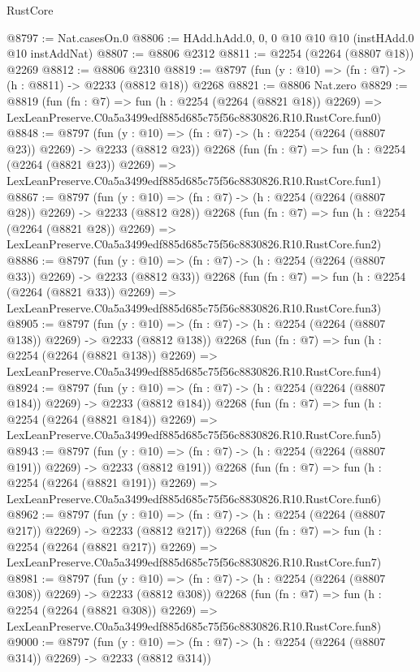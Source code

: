 \begin{lexlean}{RustCore}
\begin{coremodule}
@8797 := Nat.casesOn.{0}
@8806 := HAdd.hAdd.{0, 0, 0} @10 @10 @10 (instHAdd.{0} @10 instAddNat)
@8807 := @8806 @2312
@8811 := @2254 (@2264 (@8807 @18)) @2269
@8812 := @8806 @2310
@8819 := @8797 (fun (y : @10) => (fn : @7) -> (h : @8811) -> @2233 (@8812 @18)) @2268
@8821 := @8806 Nat.zero
@8829 := @8819
    (fun (fn : @7) =>
    fun (h : @2254 (@2264 (@8821 @18)) @2269) =>
    LexLeanPreserve.C0a5a3499edf885d685c75f56c8830826.R10.RustCore.fun0)
@8848 := @8797
    (fun (y : @10) => (fn : @7) -> (h : @2254 (@2264 (@8807 @23)) @2269) -> @2233 (@8812 @23))
    @2268
    (fun (fn : @7) =>
    fun (h : @2254 (@2264 (@8821 @23)) @2269) =>
    LexLeanPreserve.C0a5a3499edf885d685c75f56c8830826.R10.RustCore.fun1)
@8867 := @8797
    (fun (y : @10) => (fn : @7) -> (h : @2254 (@2264 (@8807 @28)) @2269) -> @2233 (@8812 @28))
    @2268
    (fun (fn : @7) =>
    fun (h : @2254 (@2264 (@8821 @28)) @2269) =>
    LexLeanPreserve.C0a5a3499edf885d685c75f56c8830826.R10.RustCore.fun2)
@8886 := @8797
    (fun (y : @10) => (fn : @7) -> (h : @2254 (@2264 (@8807 @33)) @2269) -> @2233 (@8812 @33))
    @2268
    (fun (fn : @7) =>
    fun (h : @2254 (@2264 (@8821 @33)) @2269) =>
    LexLeanPreserve.C0a5a3499edf885d685c75f56c8830826.R10.RustCore.fun3)
@8905 := @8797
    (fun (y : @10) => (fn : @7) -> (h : @2254 (@2264 (@8807 @138)) @2269) -> @2233 (@8812 @138))
    @2268
    (fun (fn : @7) =>
    fun (h : @2254 (@2264 (@8821 @138)) @2269) =>
    LexLeanPreserve.C0a5a3499edf885d685c75f56c8830826.R10.RustCore.fun4)
@8924 := @8797
    (fun (y : @10) => (fn : @7) -> (h : @2254 (@2264 (@8807 @184)) @2269) -> @2233 (@8812 @184))
    @2268
    (fun (fn : @7) =>
    fun (h : @2254 (@2264 (@8821 @184)) @2269) =>
    LexLeanPreserve.C0a5a3499edf885d685c75f56c8830826.R10.RustCore.fun5)
@8943 := @8797
    (fun (y : @10) => (fn : @7) -> (h : @2254 (@2264 (@8807 @191)) @2269) -> @2233 (@8812 @191))
    @2268
    (fun (fn : @7) =>
    fun (h : @2254 (@2264 (@8821 @191)) @2269) =>
    LexLeanPreserve.C0a5a3499edf885d685c75f56c8830826.R10.RustCore.fun6)
@8962 := @8797
    (fun (y : @10) => (fn : @7) -> (h : @2254 (@2264 (@8807 @217)) @2269) -> @2233 (@8812 @217))
    @2268
    (fun (fn : @7) =>
    fun (h : @2254 (@2264 (@8821 @217)) @2269) =>
    LexLeanPreserve.C0a5a3499edf885d685c75f56c8830826.R10.RustCore.fun7)
@8981 := @8797
    (fun (y : @10) => (fn : @7) -> (h : @2254 (@2264 (@8807 @308)) @2269) -> @2233 (@8812 @308))
    @2268
    (fun (fn : @7) =>
    fun (h : @2254 (@2264 (@8821 @308)) @2269) =>
    LexLeanPreserve.C0a5a3499edf885d685c75f56c8830826.R10.RustCore.fun8)
@9000 := @8797
    (fun (y : @10) => (fn : @7) -> (h : @2254 (@2264 (@8807 @314)) @2269) -> @2233 (@8812 @314))

\end{coremodule}
\end{lexlean}
